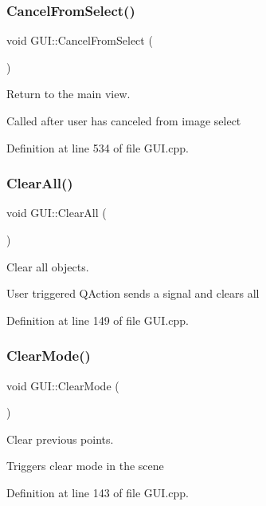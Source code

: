 \subsubsection{\texorpdfstring{Cancel\+From\+Select()}{CancelFromSelect()}}
{\footnotesize\ttfamily void G\+U\+I\+::\+Cancel\+From\+Select (\begin{DoxyParamCaption}{ }\end{DoxyParamCaption})}



Return to the main view. 

Called after user has canceled from image select 

Definition at line 534 of file G\+U\+I.\+cpp.

\mbox{\label{classGUI_a19c82a62a2b41460c81317fa967e3a1e}} 
\subsubsection{\texorpdfstring{Clear\+All()}{ClearAll()}}
{\footnotesize\ttfamily void G\+U\+I\+::\+Clear\+All (\begin{DoxyParamCaption}{ }\end{DoxyParamCaption})}



Clear all objects. 

User triggered Q\+Action sends a signal and clears all 

Definition at line 149 of file G\+U\+I.\+cpp.

\mbox{\label{classGUI_afb6e169c9372800e69c70a3889420325}} 
\subsubsection{\texorpdfstring{Clear\+Mode()}{ClearMode()}}
{\footnotesize\ttfamily void G\+U\+I\+::\+Clear\+Mode (\begin{DoxyParamCaption}{ }\end{DoxyParamCaption})}



Clear previous points. 

Triggers clear mode in the scene 

Definition at line 143 of file G\+U\+I.\+cpp.

